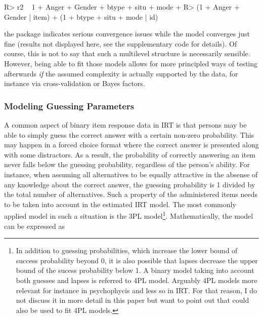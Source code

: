 \documentclass[
]{jss}
\begin{document}
\begin{CodeChunk}

\begin{CodeInput}
R> r2 ~ 1 + Anger + Gender + btype + situ + mode + 
R>   (1 + Anger + Gender | item) + (1 + btype + situ + mode  | id)
\end{CodeInput}
\end{CodeChunk}

the  package indicates serious convergence issues while the
 model converges just fine (results not displayed here, see
the supplementary  code for details). Of course, this is not
to say that such a multilevel structure is necessarily sensible.
However, being able to fit those models allows for more principled ways
of testing afterwards \emph{if} the assumed complexity is actually
supported by the data, for instance via cross-validation or Bayes
factors.

\hypertarget{modeling-guessing-parameters}{%
\subsubsection{Modeling Guessing
Parameters}\label{modeling-guessing-parameters}}

A common aspect of binary item response data in IRT is that persons may
be able to simply guess the correct answer with a certain non-zero
probability. This may happen in a forced choice format where the correct
answer is presented along with some distractors. As a result, the
probability of correctly answering an item never falls below the
guessing probability, regardless of the person's ability. For instance,
when assuming all alternatives to be equally attractive in the absense
of any knowledge about the correct answer, the guessing probability is 1
divided by the total number of alternatives. Such a property of the
administered items needs to be taken into account in the estimated IRT
model. The most commonly applied model in such a situation is the 3PL
model\footnote{In addition to guessing probabilities, which increase the lower
bound of success probability beyond 0, it is also possible that lapses decrease
the upper bound of the sucess probability below 1. A binary model taking into
account both guesses and lapses is referred to 4PL model. Arguably 4PL models
more relevant for instance in psychophycis and less so in IRT. For that reason,
I do not discuss it in more detail in this paper but want to point out that
 could also be used to fit 4PL models.}. Mathematically, the
model can be expressed as
\end{document}
